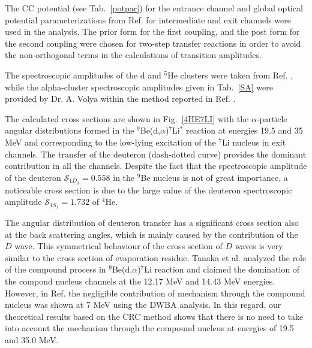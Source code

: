 \documentclass[10pt]{iopart}
\begin{document}
The CC potential (see Tab.~\ref{potpar}) for the entrance channel and global optical potential parameterizations from Ref. \cite{globalTriton, globalAlpha, global6Li} for intermediate and exit channels were used in the analysis.
The prior form for the first coupling, and the post form for the second coupling were chosen for two-step transfer reactions in order to avoid the non-orthogonal terms in the calculations of transition amplitudes.


The spectroscopic amplitudes of the d and ${}^5$He clusters were taken from Ref. \cite{fiveSA}, while the alpha-cluster spectroscopic amplitudes given in Tab.~\ref{SA} were provided by Dr. A. Volya within the method reported in Ref. \cite{volya2017}.

The calculated cross sections are shown in Fig.~\ref{4HE7LI} with the $\alpha$-particle angular distributions formed in the ${}^9$Be(d,$\alpha$)${}^7$Li$^*$ reaction at energies 19.5 and 35 MeV and corresponding to the low-lying excitation of the ${}^7$Li nucleus in exit channels. The transfer of the deuteron (dash-dotted curve) provides the dominant contribution in all the channels. Despite the fact that the spectroscopic amplitude of the deuteron $\mathcal{S}_{1{D}_3}=0.558$ in the ${}^9$Be nucleus is not of great importance, a noticeable cross section is due to the large value of the deuteron spectroscopic amplitude $\mathcal{S}_{1{S}_1}=1.732$  of ${}^4$He.

The angular distribution of deuteron transfer has a significant cross section also at the back scattering angles, which is mainly caused by the contribution of the $D$ wave. This symmetrical behaviour of the cross section of $D$ waves is very similar to the cross section of evaporation residue. Tanaka et al. \cite{tanaka1978} analyzed the role of the compound process in ${}^9$Be(d,$\alpha$)${}^7$Li reaction and claimed the domination of the compond nucleus channels at the 12.17 MeV and 14.43 MeV energies. However, in Ref. \cite{bodek1989} the negligible contribution of mechanism through the compound nucleus was shown at 7 MeV using the DWBA analysis. In this regard, our theoretical results based on the CRC method shows that there is no need to take into account the mechanism through the compound nucleus at energies of 19.5 and 35.0 MeV.
\end{document}
